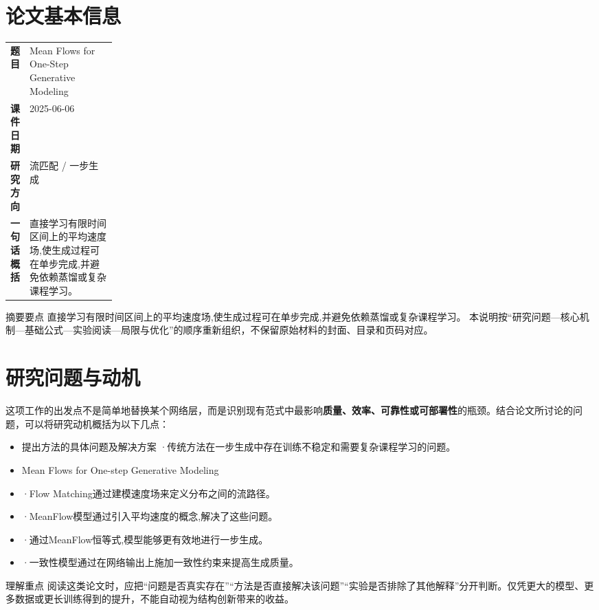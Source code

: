 \documentclass[UTF8,11pt,a4paper]{ctexart}
\newcommand{\term}[1]{\textbf{\textcolor{mainblue}{#1}}}
\begin{document}
\section{论文基本信息}
\begin{center}
\begin{tabularx}{0.94\linewidth}{>{\bfseries}p{0.18\linewidth}X}
\toprule
题目 & Mean Flows for One-Step Generative Modeling\\
课件日期 & 2025-06-06\\
研究方向 & 流匹配 / 一步生成\\
一句话概括 & 直接学习有限时间区间上的平均速度场,使生成过程可在单步完成,并避免依赖蒸馏或复杂课程学习。\\
\bottomrule
\end{tabularx}
\end{center}

\begin{infobox}{摘要要点}
直接学习有限时间区间上的平均速度场,使生成过程可在单步完成,并避免依赖蒸馏或复杂课程学习。 本说明按“研究问题—核心机制—基础公式—实验阅读—局限与优化”的顺序重新组织，不保留原始材料的封面、目录和页码对应。
\end{infobox}

\section{研究问题与动机}
这项工作的出发点不是简单地替换某个网络层，而是识别现有范式中最影响\term{质量、效率、可靠性或可部署性}的瓶颈。结合论文所讨论的问题，可以将研究动机概括为以下几点：
\begin{itemize}
\item 提出方法的具体问题及解决方案 ·传统方法在一步生成中存在训练不稳定和需要复杂课程学习的问题。
\item Mean Flows for One-step Generative Modeling
\item ·Flow Matching通过建模速度场来定义分布之间的流路径。
\item ·MeanFlow模型通过引入平均速度的概念,解决了这些问题。
\item ·通过MeanFlow恒等式,模型能够更有效地进行一步生成。
\item ·一致性模型通过在网络输出上施加一致性约束来提高生成质量。
\end{itemize}

\begin{notebox}{理解重点}
阅读这类论文时，应把“问题是否真实存在”“方法是否直接解决该问题”“实验是否排除了其他解释”分开判断。仅凭更大的模型、更多数据或更长训练得到的提升，不能自动视为结构创新带来的收益。
\end{notebox}
\end{document}

